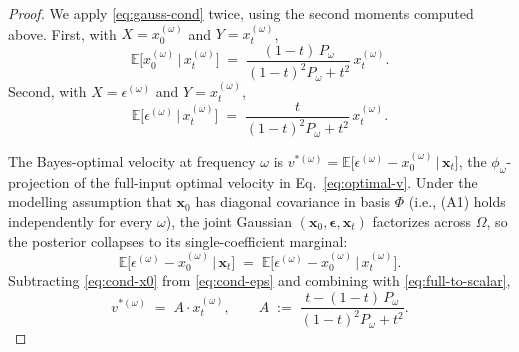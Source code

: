 \begin{proof}
We apply \eqref{eq:gauss-cond} twice, using the second moments computed above. First, with $X = x_0^{(\omega)}$ and $Y = x_t^{(\omega)}$,
\begin{equation}
  \mathbb{E}\bigl[x_0^{(\omega)} \,\big|\, x_t^{(\omega)}\bigr]
  \;=\; \frac{(1-t)\,P_\omega}{(1-t)^2 P_\omega + t^2}\, x_t^{(\omega)}.
  \label{eq:cond-x0}
\end{equation}
Second, with $X = \epsilon^{(\omega)}$ and $Y = x_t^{(\omega)}$,
\begin{equation}
  \mathbb{E}\bigl[\epsilon^{(\omega)} \,\big|\, x_t^{(\omega)}\bigr]
  \;=\; \frac{t}{(1-t)^2 P_\omega + t^2}\, x_t^{(\omega)}.
  \label{eq:cond-eps}
\end{equation}

The Bayes-optimal velocity at frequency $\omega$ is $v^{*(\omega)} = \mathbb{E}\bigl[\epsilon^{(\omega)} - x_0^{(\omega)} \,\big|\, \mathbf{x}_t\bigr]$, the $\phi_\omega$-projection of the full-input optimal velocity in Eq.~\eqref{eq:optimal-v}. Under the modelling assumption that $\mathbf{x}_0$ has diagonal covariance in basis $\Phi$ (i.e., (A1) holds independently for every $\omega$), the joint Gaussian $(\mathbf{x}_0, \boldsymbol{\epsilon}, \mathbf{x}_t)$ factorizes across $\Omega$, so the posterior collapses to its single-coefficient marginal:
\begin{equation}
  \mathbb{E}\bigl[\epsilon^{(\omega)} - x_0^{(\omega)} \,\big|\, \mathbf{x}_t\bigr]
  \;=\; \mathbb{E}\bigl[\epsilon^{(\omega)} - x_0^{(\omega)} \,\big|\, x_t^{(\omega)}\bigr].
  \label{eq:full-to-scalar}
\end{equation}
Subtracting \eqref{eq:cond-x0} from \eqref{eq:cond-eps} and combining with \eqref{eq:full-to-scalar},
\begin{equation}
  v^{*(\omega)} \;=\; A \cdot x_t^{(\omega)},
  \qquad
  A \;:=\; \frac{t - (1-t)\,P_\omega}{(1-t)^2 P_\omega + t^2}.
  \label{eq:vstar-linear}
\end{equation}


\end{proof}
